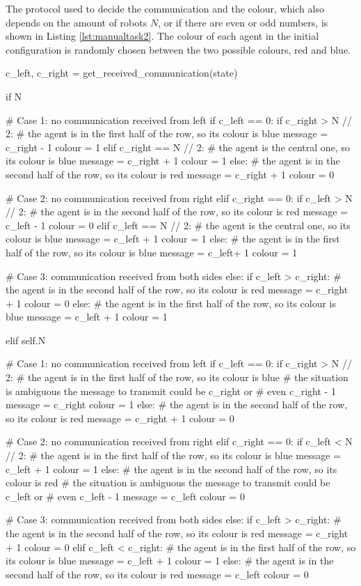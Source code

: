 The protocol used to decide the communication and the colour, which also 
depends on the amount of robots $N$, or if there are even or odd numbers, is 
shown in Listing \ref{lst:manualtask2}. The colour of each agent in the initial 
configuration is randomly chosen between the two possible colours, red and blue.

\medskip
\begin{python}
	c_left, c_right = get_received_communication(state)
	
	if N %
	
	# Case 1: no communication received from left
	if c_left == 0:
	if c_right > N // 2:
	# the agent is in the first half of the row, so its colour is blue
	message = c_right - 1
	colour = 1
	elif c_right == N // 2:
	# the agent is the central one, so its colour is blue
	message = c_right + 1
	colour = 1
	else:
	# the agent is in the second half of the row, so its colour is red
	message = c_right + 1
	colour = 0
	
	# Case 2: no communication received from right
	elif c_right == 0:
	if c_left > N // 2:
	# the agent is in the second half of the row, so its colour is red
	message = c_left - 1
	colour = 0
	elif c_left == N // 2:
	# the agent is the central one, so its colour is blue
	message = c_left + 1
	colour = 1
	else:
	# the agent is in the first half of the row, so its colour is blue
	message = c_left+ 1
	colour = 1
	
	# Case 3: communication received from both sides
	else:
	if c_left > c_right:
	# the agent is in the second half of the row, so its colour is red
	message = c_right + 1
	colour = 0
	else:
	# the agent is in the first half of the row, so its colour is blue
	message = c_left + 1
	colour = 1
	
	
	elif self.N %
	
	# Case 1: no communication received from left
	if c_left == 0:
	if c_right > N // 2:
	# the agent is in the first half of the row, so its colour is blue
	# the situation is ambiguous the message to transmit could be c_right or 
	# even c_right - 1
	message = c_right
	colour = 1
	else:
	# the agent is in the second half of the row, so its colour is red
	message = c_right + 1
	colour = 0
	
	# Case 2: no communication received from right
	elif c_right == 0:
	if c_left < N // 2:
	# the agent is in the first half of the row, so its colour is blue
	message = c_left + 1
	colour = 1
	else:
	# the agent is in the second half of the row, so its colour is red
	# the situation is ambiguous the message to transmit could be c_left or 
	# even c_left - 1
	message = c_left
	colour = 0
	
	# Case 3: communication received from both sides
	else:
	if c_left > c_right:
	# the agent is in the second half of the row, so its colour is red
	message = c_right + 1
	colour = 0
	elif c_left < c_right:
	# the agent is in the first half of the row, so its colour is blue
	message = c_left + 1
	colour = 1
	else:
	# the agent is in the second half of the row, so its colour is red
	message = c_left
	colour = 0
\end{python}


